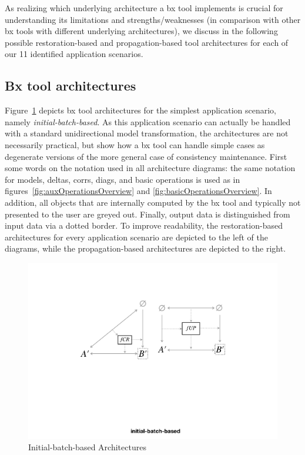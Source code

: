 As realizing which underlying architecture a bx tool implements is crucial for understanding its limitations and strengths/weaknesses (in comparison with other bx tools with different underlying architectures), we discuss in the following possible restoration-based and propagation-based tool architectures for each of our 11 identified application scenarios. 

\subsection{Bx tool architectures}
\label{sec:bx-tool-architectures}

Figure~\ref{fig:initialBatchBased} depicts bx tool architectures for the simplest application scenario, namely \emph{initial-batch-based}.
As this application scenario can actually be handled with a standard unidirectional model transformation, the architectures are not necessarily practical, but show how a bx tool can handle simple cases as degenerate versions of the more general case of consistency maintenance.
First some words on the notation used in all architecture diagrams: the same notation for models, deltas, corrs, diags, and basic operations is used as in figures~\ref{fig:auxOperationsOverview} and \ref{fig:basicOperationsOverview}.
In addition, all objects that are internally computed by the bx tool and typically not presented to the user are greyed out.
Finally, output data is distinguished from input data via a dotted border.
To improve readability, the restoration-based architectures for every application scenario are depicted to the left of the diagrams, while the propagation-based architectures are depicted to the right.
%
\begin{figure}[tb!]
	\centering
	\includegraphics[width=0.8\columnwidth]{diagrams/foundations//initial-batch-based}
	\caption{Initial-batch-based Architectures}
	\label{fig:initialBatchBased}
\end{figure}

